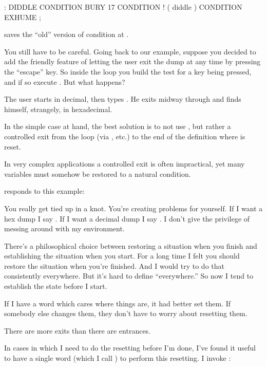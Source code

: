 \begin{Code}
: DIDDLE    CONDITION BURY  17 CONDITION !  ( diddle )
   CONDITION EXHUME ;
\end{Code}
 saves the ``old'' version of condition at .

You still have to be careful. Going back to our  example,
suppose you decided to add the friendly feature of letting the user exit
the dump at any time by pressing the ``escape'' key. So inside the loop
you build the test for a key being pressed, and if so execute
. But what happens?

The user starts in decimal, then types . He exits
 midway through and finds himself, strangely, in hexadecimal.

In the simple case at hand, the best solution is to not use
, but rather a controlled exit from the loop (via
, etc.) to the end of the definition where
 is reset.

In very complex applications a controlled exit is often impractical,
yet many variables must somehow be restored to a natural condition.

\begin{interview}%
 responds to this example:

\begin{tfquot}
You really get tied up in a knot. You're creating problems for
yourself. If I want a hex dump I say . If I
want a decimal dump I say . I don't give
 the privilege of messing around with my environment.

There's a philosophical choice between restoring a situation when you
finish and establishing the situation when you start. For a long time I felt
you should restore the situation when you're finished. And I would try to
do that consistently everywhere. But it's hard to define ``everywhere.'' So
now I tend to establish the state before I start.

If I have a word which cares where things are, it had better set them. If
somebody else changes them, they don't have to worry about resetting
them.

There are more exits than there are entrances.
\end{tfquot}
\end{interview}

In cases in which I need to do the resetting before I'm done, I've found it
useful to have a single word (which I call ) to perform this
resetting. I invoke :


